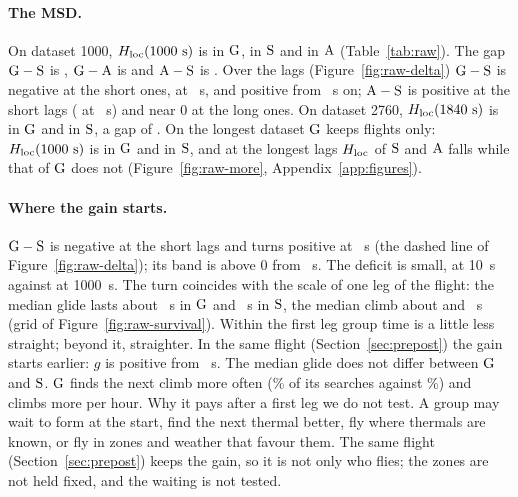 \paragraph{The MSD.} On dataset 1000, $H_\mathrm{loc}(1000~\mathrm{s})$ is \RawHKOneG{} \RawHKOneGBand{} in $\mathrm{G}$, \RawHKOneS{} \RawHKOneSBand{} in $\mathrm{S}$ and \RawHKOneA{} \RawHKOneABand{} in $\mathrm{A}$ (Table~\ref{tab:raw}).
The gap $\mathrm{G}-\mathrm{S}$ is \RawGapHK{} \RawGapHKBand, $\mathrm{G}-\mathrm{A}$ is \RawGapHKGA{} \RawGapHKGABand{} and $\mathrm{A}-\mathrm{S}$ is \RawGapHKAS{} \RawGapHKASBand. Over the lags (Figure~\ref{fig:raw-delta}) $\mathrm{G}-\mathrm{S}$ is negative at the short ones,
\RawGapFirst{} \RawGapFirstBand{} at \RawFirstLag~s, and positive from \RawGapCross~s on; $\mathrm{A}-\mathrm{S}$ is positive at the short lags (\RawGapFirstAS{} \RawGapFirstASBand{} at \RawFirstLag~s) and near 0 at the long ones. On dataset 2760, $H_\mathrm{loc}(1840~\mathrm{s})$ is \RawHQTwoG{} in $\mathrm{G}$ and \RawHQTwoS{} in $\mathrm{S}$,
a gap of \RawGapHQ{} \RawGapHQBand. On the longest dataset $\mathrm{G}$ keeps \RawFlightsLongG{} flights only: $H_\mathrm{loc}(1000~\mathrm{s})$ is \RawHKLongG{} \RawHKLongGBand{} in $\mathrm{G}$ and \RawHKLongS{} in $\mathrm{S}$, and at the longest lags $H_\mathrm{loc}$ of $\mathrm{S}$ and $\mathrm{A}$ falls while that of $\mathrm{G}$ does not (Figure~\ref{fig:raw-more}, Appendix~\ref{app:figures}).

\paragraph{Where the gain starts.} $\mathrm{G}-\mathrm{S}$ is negative at the short lags and turns positive at \RawGapCross~s (the dashed line of Figure~\ref{fig:raw-delta}); its band is above 0 from \RawGapSig~s.
The deficit is small, \RawGapFirst{} at 10~s against \RawGapHK{} at 1000~s. The turn coincides with the scale of one leg of the flight: the median glide lasts about \RawGlideMedianG~s in $\mathrm{G}$ and \RawGlideMedianS~s in $\mathrm{S}$, the median climb about \RawClimbMedianG{} and \RawClimbMedianS~s (grid of Figure~\ref{fig:raw-survival}).
Within the first leg group time is a little less straight; beyond it, straighter. In the same flight (Section~\ref{sec:prepost}) the gain starts earlier: $g$ is positive from \PreGCross~s.
The median glide does not differ between $\mathrm{G}$ and $\mathrm{S}$. $\mathrm{G}$ finds the next climb more often (\RawStatFoundG\% of its searches against \RawStatFoundS\%) and climbs more per hour.
Why it pays after a first leg we do not test. A group may wait to form at the start, find the next thermal better, fly where thermals are known, or fly in zones and weather that favour them. The same flight (Section~\ref{sec:prepost}) keeps the gain, so it is not only who flies; the zones are not held fixed, and the waiting is not tested.

